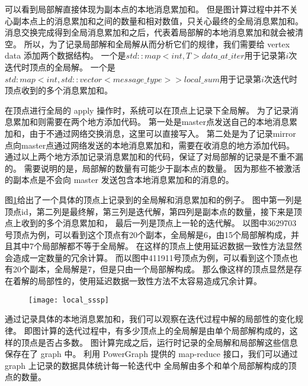 可以看到局部解直接体现为副本点的本地消息累加和。
但是图计算过程中并不关心副本点上的消息累加和之间的数量和相对数值，只关心最终的全局消息累加和。
消息交换完成得到全局消息累加和之后，代表着局部解的本地消息累加和就会被清空。
所以，为了记录局部解和全局解从而分析它们的规律，我们需要给 vertex data 添加两个数据结构。
一个是$std::map<int,T> data\_at\_iter$用于记录第$i$次迭代时顶点的全局解。
一个是$std:map<int, std::vector<message\_type>> local\_sum$用于记录第$i$次迭代时
顶点收到的多个消息累加和。

在顶点进行全局的 apply 操作时，系统可以在顶点上记录下全局解。
为了记录消息累加和则需要在两个地方添加代码。
第一处是master点发送自己的本地消息累加和，由于不通过网络交换消息，这里可以直接写入。
第二处是为了记录mirror点向master点通过网络发送的本地消息累加和，需要在收消息的地方添加代码。
通过以上两个地方添加记录消息累加和的代码，保证了对局部解的记录是不重不漏的。 
需要说明的是，局部解的数量有可能少于副本点的数量。
因为那些不被激活的副本点是不会向 master 发送包含本地消息累加和的消息的。


图\ref{fig:local_sssp}给出了一个具体的顶点上记录到的全局解和消息累加和的例子。
图中第一列是顶点id，第二列是最终解，第三列是迭代解，第四列是副本点的数量，接下来是顶点上收到的多个消息累加和，
最后一列是顶点上一轮的迭代解。
以图中3629703号顶点为例，可以看到这个顶点有20个副本，全局解是6，由15个局部解构成，并且其中7个局部解都不等于全局解。
在这样的顶点上使用延迟数据一致性方法显然会造成一定数量的冗余计算。
而以图中411911号顶点为例，可以看到这个顶点也有20个副本，全局解是7，但是只由一个局部解构成。
那么像这样的顶点显然是存在着解的局部性的，使用延迟数据一致性方法不太容易造成冗余计算。


\begin{figure}[!htbp]
  \centering
  \texttt{[image: local\_sssp]}
  \label{fig:local_sssp}
\end{figure}
通过记录具体的本地消息累加和，我们可以观察在迭代过程中解的局部性的变化规律。
即图计算的迭代过程中，有多少顶点上的全局解是由单个局部解构成的，这样的顶点是否占多数。
图计算完成之后，运行时记录的全局解和局部解这些信息保存在了 graph 中。 
利用 PowerGraph 提供的 map-reduce 接口，我们可以通过 graph 上记录的数据具体统计每一轮迭代中
全局解由多个和单个局部解构成的顶点的数量。




